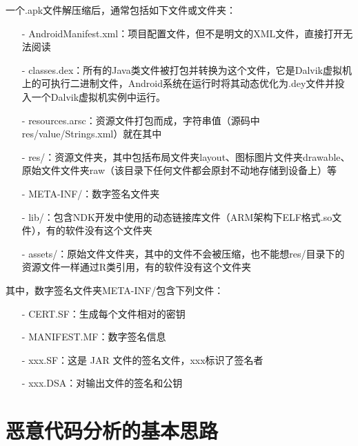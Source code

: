 一个.apk文件解压缩后，通常包括如下文件或文件夹：
\begin{itemize}
	\item[-] AndroidManifest.xml：项目配置文件，但不是明文的XML文件，直接打开无法阅读
	\item[-] classes.dex：所有的Java类文件被打包并转换为这个文件，它是Dalvik虚拟机上的可执行二进制文件，Android系统在运行时将其动态优化为.dey文件并投入一个Dalvik虚拟机实例中运行。
	\item[-] resources.arsc：资源文件打包而成，字符串值（源码中res/value/Strings.xml）就在其中
	\item[-] res/：资源文件夹，其中包括布局文件夹layout、图标图片文件夹drawable、原始文件文件夹raw（该目录下任何文件都会原封不动地存储到设备上）等
	\item[-] META-INF/：数字签名文件夹
	\item[-] lib/：包含NDK开发中使用的动态链接库文件（ARM架构下ELF格式.so文件），有的软件没有这个文件夹
	\item[-] assets/：原始文件文件夹，其中的文件不会被压缩，也不能想res/目录下的资源文件一样通过R类引用，有的软件没有这个文件夹
\end{itemize}

其中，数字签名文件夹META-INF/包含下列文件：
\begin{itemize}
	\item[-] CERT.SF：生成每个文件相对的密钥
	\item[-] MANIFEST.MF：数字签名信息
	\item[-] xxx.SF：这是 JAR 文件的签名文件，xxx标识了签名者
	\item[-] xxx.DSA：对输出文件的签名和公钥
\end{itemize}

\section{恶意代码分析的基本思路}
